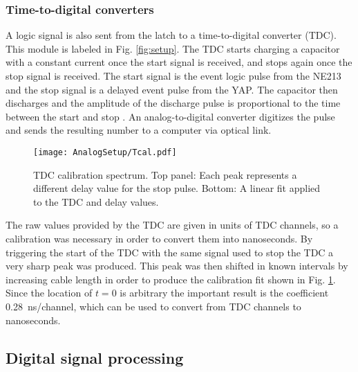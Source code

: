 \documentclass[main.tex]{subfiles}
\begin{document}
\subsubsection{Time-to-digital converters}
A logic signal is also sent from the latch to a time-to-digital converter (TDC). This module is labeled  in Fig. \ref{fig:setup}. The TDC starts charging a capacitor with a constant current once the start signal is received, and stops again once the stop signal is received. The start signal is the event logic pulse from the NE213 and the stop signal is a delayed event pulse from the YAP. The capacitor then discharges and the amplitude of the discharge pulse is proportional to the time between the start and stop \cite{CAENTDC}. An analog-to-digital converter digitizes the pulse and sends the resulting number to a computer via optical link.
\begin{figure}[h]
	\centering
    	\texttt{[image: AnalogSetup/Tcal.pdf]}
        \caption[TDC calibration spectrum.]{TDC calibration spectrum. Top panel: Each peak represents a different delay value for the stop pulse. Bottom: A linear fit applied to the TDC and delay values.}
	    \label{fig:Tcal} 
\end{figure}
The raw values provided by the TDC are given in units of TDC channels, so a calibration was necessary in order to convert them into nanoseconds. By triggering the start of the TDC with the same signal used to stop the TDC a very sharp peak was produced. This peak was then shifted in known intervals by increasing cable length in order to produce the calibration fit shown in Fig. \ref{fig:Tcal}. Since the location of $t=0$ is arbitrary the important result is the coefficient \SI{0.28}{\nano\second/channel}, which can be used to convert from TDC channels to nanoseconds.


\subsection{Digital signal processing}
\end{document}
